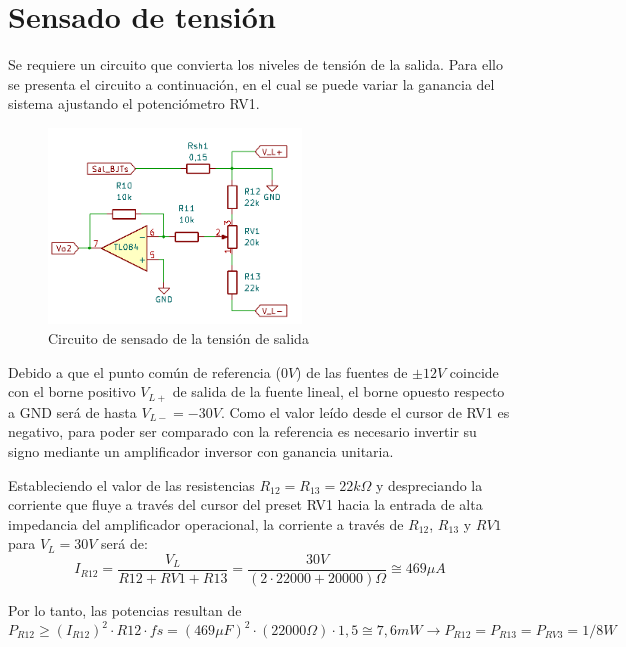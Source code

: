 \section{Sensado de tensión}
Se requiere un circuito que convierta los niveles de tensión de la salida. Para ello se presenta el circuito a continuación, en el cual se puede variar la ganancia del sistema ajustando el potenciómetro RV1.
\begin{figure} [H]
	\centering
	\includegraphics[width=0.6\textwidth]{./imagenes/Sensor_tension.png}
	\caption{Circuito de sensado de la tensión de salida}
	\label{F:Sensor_tension}
\end{figure} \par 

Debido a que el punto común de referencia ($0 V$) de las fuentes de $\pm 12V$ coincide con el borne positivo $V_{L+}$ de salida de la fuente lineal, el borne opuesto respecto a GND será de hasta $V_{L-}=-30V$. Como el valor leído desde el cursor de RV1 es negativo, para poder ser comparado con la referencia es necesario invertir su signo mediante un amplificador inversor con ganancia unitaria. \par 

Estableciendo el valor de las resistencias $R_{12}=R_{13}=22k\Omega$ y despreciando la corriente que fluye a través del cursor del preset RV1 hacia la entrada de alta impedancia del amplificador operacional, la corriente a través de $R_{12}$, $R_{13}$ y $RV1$ para $V_L=30V$ será de:
\begin{equation}
I_{R12}=\frac{V_L}{R12+RV1+R13}=\frac{30 V}{(2\cdot 22000+20000)\Omega}\cong 469\mu A
\end{equation} \par 

Por lo tanto, las potencias resultan de
\begin{equation}
P_{R12}\geq (I_{R12})^2\cdot R12\cdot fs=(469\mu F)^2\cdot (22000 \Omega)\cdot 1,5 \cong 7,6 mW \to P_{R12}=P_{R13}=P_{RV3}=1/8W
\end{equation} \par 

